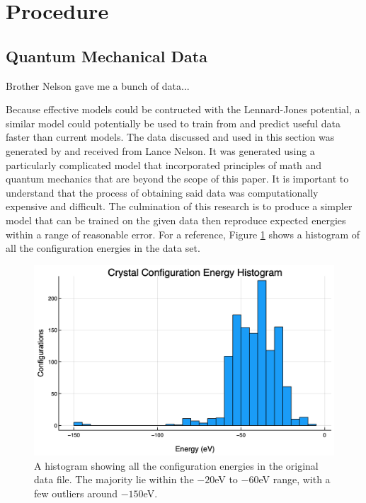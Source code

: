 \section{Procedure}\label{Sect:procedure}
\subsection{Quantum Mechanical Data}\label{Sect:procedureData}
%
%
%
%
%
%
%
%
\par Brother Nelson gave me a bunch of data...
\par Because effective models could be contructed with the Lennard-Jones potential, a similar model could potentially be used to train from and predict useful data faster than current models. The data discussed and used in this section was generated by and received from Lance Nelson. It was generated using a particularly complicated model that incorporated principles of math and quantum mechanics that are beyond the scope of this paper. It is important to understand that the process of obtaining said data was computationally expensive and difficult. The culmination of this research is to produce a simpler model that can be trained on the given data then reproduce expected energies within a range of reasonable error. For a reference, Figure \ref{histEnergy} shows a histogram of all the configuration energies in the data set.

\begin{figure}[h]
\includegraphics[scale = 0.3]{Figures/UnitCellEnergies}
\caption{A histogram showing all the configuration energies in the original data file. The majority lie within the $-20$eV to $-60$eV range, with a few outliers around $-150$eV.
\label{histEnergy}} 
\end{figure}

